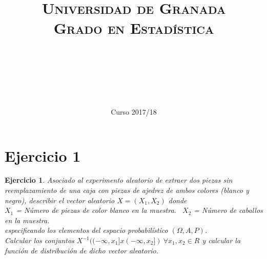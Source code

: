 \documentclass[11pt, a4paper]{article}
\title{
  \normalfont \normalsize 
  \textsc{Universidad de Granada} \\ [25pt]    %
  \textsc{Grado en Estadística} \\ [25pt]    %
  \horrule{0.5pt} \\[0.4cm] %
  \huge \sffamily\subject\\ %
  \horrule{2pt} \\[0.5cm] %
}
\author{\Large\sffamily{\docauthor}}
\date{\vspace{-1.5em} \normalsize \sffamily Curso 2017/18}
\newif\IfInSansMode
\theoremstyle{theorem-style}
\theoremstyle{definition-style}
\newtheorem{ejer}{Ejercicio}[section]
\theoremstyle{remark-style}
\theoremstyle{example-style}
\begin{document}
\maketitle  %
\vfill
\begin{center}
\end{center}
\newpage
\tableofcontents    %
\newpage



\section{Ejercicio 1}

\begin{ejer} 
Asociado al experimento aleatorio de extraer dos piezas sin reemplazamiento de una caja con piezas de ajedrez
de ambos colores (blanco y negro), describir el vector aleatorio $X = (X_1,X_2)$ donde \\
$X_1$ = Número de piezas de color blanco en la muestra. \
$X_2$ = Número de caballos en la muestra. \\
especificando los elementos del espacio probabilístico $(\Omega,A,P)$. \\
Calcular los conjuntos $X^{-1}((-\infty,x_1]x(-\infty,x_2]) \ \forall x_1,x_2 \in R$ y calcular la función de distribución de dicho vector aleatorio.
\end{ejer}
\end{document}
